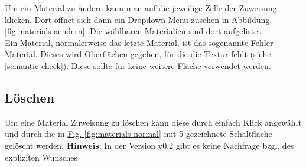 \documentclass{book}
\newcommand{\hinweis}[1]{\newline \textbf{Hinweis}: #1 \newline}
\begin{document}
					Um ein Material zu ändern kann man auf die jeweilige Zelle der Zuweisung klicken. Dort öffnet sich dann ein Dropdown Menu zusehen in \hyperref[fig:materials aendern]{Abbildung \ref{fig:materials aendern}}. Die wählbaren Materialien sind dort aufgelistet. \\
					Ein Material, normalerweise das letzte Material, ist das sogenannte Fehler Material. Dieses wird Oberflächen gegeben, für die die Textur fehlt (siehe \hyperref[semantic check]{\ref{semantic check}}). Diese sollte für keine weitere Fläche verwendet werden.
			\subsection{Löschen} \label{material-loeschen}
				Um eine Material Zuweisung zu löschen kann diese durch einfach Klick angewählt und durch die in \hyperref[fig:materials-normal]{Fig. \ref{fig:materials-normal}} mit 5 gezeichnete Schaltfläche gelöscht werden.
	 			\hinweis{In der Version v0.2 gibt es keine Nachfrage bzgl. des expliziten Wunsches}			
\end{document}
